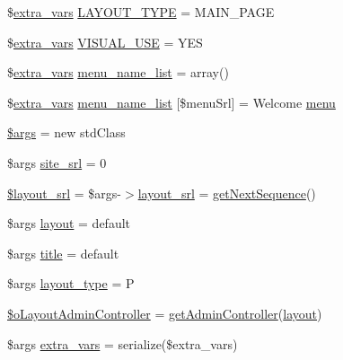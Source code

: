 \begin{DoxyCompactItemize}
\item 
\$\hyperlink{ko_8install_8php_ae1dcb37fc34a8f312d2e6abd6f806743}{extra\+\_\+vars} \hyperlink{ko_8install_8php_a559e719d2ff17f12b8fba72773e6601d}{L\+A\+Y\+O\+U\+T\+\_\+\+T\+Y\+P\+E} = \textquotesingle{}M\+A\+I\+N\+\_\+\+P\+A\+G\+E\textquotesingle{}
\item 
\$\hyperlink{ko_8install_8php_ae1dcb37fc34a8f312d2e6abd6f806743}{extra\+\_\+vars} \hyperlink{ko_8install_8php_a7d7de44c97265901bad00952f899d833}{V\+I\+S\+U\+A\+L\+\_\+\+U\+S\+E} = \textquotesingle{}Y\+E\+S\textquotesingle{}
\item 
\$\hyperlink{ko_8install_8php_ae1dcb37fc34a8f312d2e6abd6f806743}{extra\+\_\+vars} \hyperlink{ko_8install_8php_a9223cf55eb6ff5239c0396968e619fbe}{menu\+\_\+name\+\_\+list} = array()
\item 
\$\hyperlink{ko_8install_8php_ae1dcb37fc34a8f312d2e6abd6f806743}{extra\+\_\+vars} \hyperlink{ko_8install_8php_aab93e295f18667faa1458cf574553e1f}{menu\+\_\+name\+\_\+list} \mbox{[}\$menu\+Srl\mbox{]} = \textquotesingle{}Welcome \hyperlink{classmenu}{menu}\textquotesingle{}
\item 
\hyperlink{ko_8install_8php_a67e94494731d99ed23b123e95175bc10}{\$args} = new std\+Class
\item 
\$args \hyperlink{ko_8install_8php_a8b1406b4ad1048041558dce6bfe89004}{site\+\_\+srl} = 0
\item 
\hyperlink{ko_8install_8php_a77889723c4aa360089caae223118d413}{\$layout\+\_\+srl} = \$args-\/$>$\hyperlink{ko_8install_8php_a70054876db09b2519a1726663c8dd9e7}{layout\+\_\+srl} = \hyperlink{func_8inc_8php_a5a97b458f9c5b4fe3574671840aee27c}{get\+Next\+Sequence}()
\item 
\$args \hyperlink{ko_8install_8php_a0dc2cdff7167f362443808ff71ae5177}{layout} = \textquotesingle{}default\textquotesingle{}
\item 
\$args \hyperlink{ko_8install_8php_a5b072c5fd1d2228c6ba5cee13cd142e3}{title} = \textquotesingle{}default\textquotesingle{}
\item 
\$args \hyperlink{ko_8install_8php_a0532d89570cfdaebc628afac2ff5a81b}{layout\+\_\+type} = \textquotesingle{}P\textquotesingle{}
\item 
\hyperlink{ko_8install_8php_a6a03496003da7df71cf94d9accb430be}{\$o\+Layout\+Admin\+Controller} = \hyperlink{func_8inc_8php_a2f7ca88a5226536aca3b2f5682bd7b2d}{get\+Admin\+Controller}(\textquotesingle{}\hyperlink{classlayout}{layout}\textquotesingle{})
\item 
\$args \hyperlink{ko_8install_8php_ae1dcb37fc34a8f312d2e6abd6f806743}{extra\+\_\+vars} = serialize(\$extra\+\_\+vars)

\end{DoxyCompactItemize}
